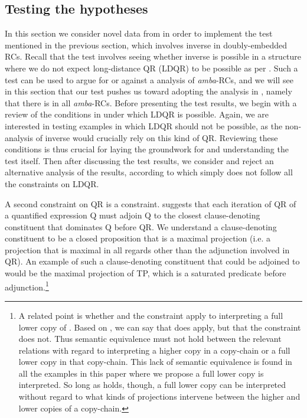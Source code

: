 \documentclass[output=paper,modfonts,nonflat,hidelinks]{langsci/langscibook}
\begin{document}
\subsection{Testing the hypotheses}\label{sec:gould:4.2}
\largerpage[-3]
In this section we consider novel data from  in order to implement the test mentioned in the previous section, which involves inverse  in doubly-embedded RCs. Recall that the test involves seeing whether inverse  is possible in a structure where we do not expect long-distance QR (LDQR) to be possible as per \citet{Fox2000}. Such a test can be used to argue for or against a  analysis of \textit{amba}{}-RCs, and we will see in this section that our test pushes us toward adopting the analysis in , namely that there is  in all \textit{amba}{}-RCs. Before presenting the test results, we begin with a review of the conditions in \citet{Fox2000} under which LDQR is possible. Again, we are interested in testing examples in which LDQR should not be possible, as the non- analysis of inverse  would crucially rely on this kind of QR. Reviewing these conditions is thus crucial for laying the groundwork for and understanding the test itself. Then after discussing the test results, we consider and reject an alternative analysis of the results, according to which  simply does not follow all the constraints on LDQR.


A second constraint on QR is a  constraint. \citet[23, 63]{Fox2000} suggests that each iteration of QR of a quantified expression Q must adjoin Q to the closest clause-denoting constituent that dominates Q before QR. We understand a clause-denoting constituent to be a closed proposition that is a maximal projection (i.e. a projection that is maximal in all regards other than the adjunction involved in QR). An example of such a clause-denoting constituent that could be adjoined to would be the maximal projection of TP, which is a saturated predicate before adjunction.\footnote{A related point is whether  and the  constraint apply to interpreting a full lower copy of . Based on \citet[p. 23; n. 6, p. 23]{Fox2000}, we can say that  does apply, but that the  constraint does not. Thus semantic equivalence must not hold between the relevant  relations with regard to interpreting a higher copy in a copy-chain or a full lower copy in that copy-chain. This lack of semantic equivalence is found in all the examples in this paper where we propose a full lower copy is interpreted. So long as  holds, though, a full lower copy can be interpreted without regard to what kinds of projections intervene between the higher and lower copies of a copy-chain.\label{fnlabel}}
\end{document}
